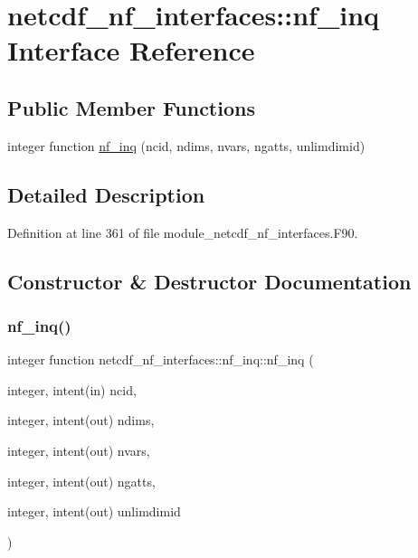 \hypertarget{interfacenetcdf__nf__interfaces_1_1nf__inq}{}\section{netcdf\+\_\+nf\+\_\+interfaces\+:\+:nf\+\_\+inq Interface Reference}
\label{interfacenetcdf__nf__interfaces_1_1nf__inq}
\subsection*{Public Member Functions}
\begin{DoxyCompactItemize}
\item 
integer function \hyperlink{interfacenetcdf__nf__interfaces_1_1nf__inq_a4915fdddd0c16216a1406ea75533e998}{nf\+\_\+inq} (ncid, ndims, nvars, ngatts, unlimdimid)
\end{DoxyCompactItemize}


\subsection{Detailed Description}


Definition at line 361 of file module\+\_\+netcdf\+\_\+nf\+\_\+interfaces.\+F90.



\subsection{Constructor \& Destructor Documentation}
\mbox{\label{interfacenetcdf__nf__interfaces_1_1nf__inq_a4915fdddd0c16216a1406ea75533e998}} 
\subsubsection{\texorpdfstring{nf\+\_\+inq()}{nf\_inq()}}
{\footnotesize\ttfamily integer function netcdf\+\_\+nf\+\_\+interfaces\+::nf\+\_\+inq\+::nf\+\_\+inq (\begin{DoxyParamCaption}\item[{integer, intent(in)}]{ncid,  }\item[{integer, intent(out)}]{ndims,  }\item[{integer, intent(out)}]{nvars,  }\item[{integer, intent(out)}]{ngatts,  }\item[{integer, intent(out)}]{unlimdimid }\end{DoxyParamCaption})}



